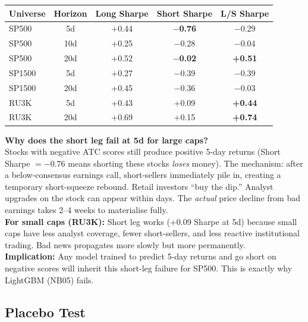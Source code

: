 \documentclass[11pt,a4paper]{article}
\begin{document}
\begin{center}
\begin{tabular}{lcccc}
\toprule
Universe & Horizon & Long Sharpe & Short Sharpe & L/S Sharpe\\
\midrule
SP500  & 5d  & +0.44 & \textcolor{signalred}{\textbf{$-$0.76}} & $-$0.29\\
SP500  & 10d & +0.25 & $-$0.28                                  & $-$0.04\\
SP500  & 20d & +0.52 & \textcolor{signalgreen}{\textbf{$-$0.02}} & \textbf{+0.51}\\
SP1500 & 5d  & +0.27 & $-$0.39 & $-$0.39\\
SP1500 & 20d & +0.45 & $-$0.36 & $-$0.03\\
RU3K   & 5d  & +0.43 & \textcolor{signalgreen}{+0.09}           & \textbf{+0.44}\\
RU3K   & 20d & +0.69 & +0.15                                    & \textbf{+0.74}\\
\bottomrule
\end{tabular}
\end{center}

\begin{callout}
\textbf{Why does the short leg fail at 5d for large caps?}\\[4pt]
Stocks with negative ATC scores still produce positive 5-day returns (Short Sharpe $= -0.76$ means shorting these stocks \emph{loses} money). The mechanism: after a below-consensus earnings call, short-sellers immediately pile in, creating a temporary short-squeeze rebound. Retail investors ``buy the dip.'' Analyst upgrades on the stock can appear within days. The \emph{actual} price decline from bad earnings takes 2--4 weeks to materialise fully.\\[4pt]
\textbf{For small caps (RU3K):} Short leg works (+0.09 Sharpe at 5d) because small caps have less analyst coverage, fewer short-sellers, and less reactive institutional trading. Bad news propagates more slowly but more permanently.\\[4pt]
\textbf{Implication:} Any model trained to predict 5-day returns and go short on negative scores will inherit this short-leg failure for SP500. This is exactly why LightGBM (NB05) fails.
\end{callout}

\subsection{Placebo Test}
\label{sec:placebo}
\end{document}
